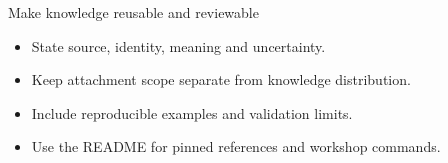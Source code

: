 \begin{frame}{Make knowledge reusable and reviewable}
\begin{itemize}
\item State source, identity, meaning and uncertainty.
\item Keep attachment scope separate from knowledge distribution.
\item Include reproducible examples and validation limits.
\item Use the README for pinned references and workshop commands.
\end{itemize}
\end{frame}
